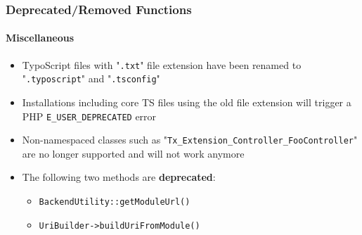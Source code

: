
\begin{frame}[fragile]
	\frametitle{Deprecated/Removed Functions}
	\framesubtitle{Miscellaneous}

	\begin{itemize}
		\item TypoScript files with "\texttt{.txt}" file extension have been
			renamed to "\texttt{.typoscript}" and "\texttt{.tsconfig}"
		\item Installations including core TS files using the old file extension
			will trigger a PHP \texttt{E\_USER\_DEPRECATED} error
		\item Non-namespaced classes such as
			"\texttt{Tx\_Extension\_Controller\_FooController}"\newline
			are no longer supported and will not work anymore
		\item The following two methods are \textbf{deprecated}:

			\begin{itemize}
				\item \texttt{BackendUtility::getModuleUrl()}
				\item \texttt{UriBuilder->buildUriFromModule()}
			\end{itemize}

	\end{itemize}

\end{frame}


